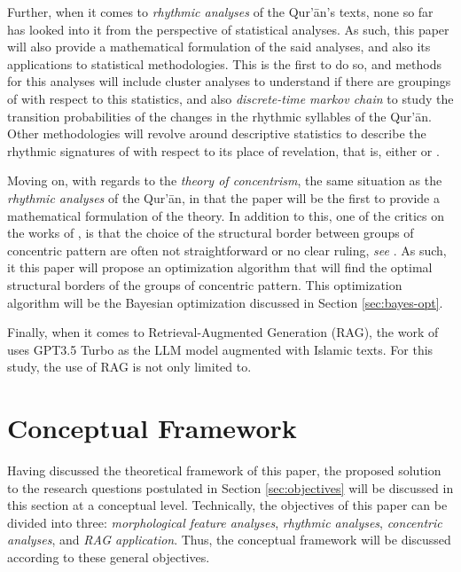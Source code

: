 Further, when it comes to \textit{rhythmic analyses} of the Qur'\=an's texts, none so far has looked into it from the perspective of statistical analyses. As such, this paper will also provide a mathematical formulation of the said analyses, and also its applications to statistical methodologies. This is the first to do so, and methods for this analyses will include cluster analyses to understand if there are groupings of   with respect to this statistics, and also \textit{discrete-time markov chain} to study the transition probabilities of the changes in the rhythmic syllables of the Qur'\=an.  Other methodologies will revolve around descriptive statistics to describe the rhythmic signatures of   with respect to its place of revelation, that is, either   or  .

Moving on, with regards to the \textit{theory of concentrism}, the same situation as the \textit{rhythmic analyses} of the Qur'\=an, in that the paper will be the first to provide a mathematical formulation of the theory. In addition to this, one of the critics on the works of , is that the choice of the structural border between groups of concentric pattern are often not straightforward or no clear ruling, \textit{see} . As such, it this paper will propose an optimization algorithm that will find the optimal structural borders of the groups of concentric pattern. This optimization algorithm will be the Bayesian optimization discussed in Section \ref{sec:bayes-opt}.

Finally, when it comes to Retrieval-Augmented Generation (RAG), the work of  uses GPT3.5 Turbo as the LLM model augmented with Islamic texts. For this study, the use of RAG is not only limited to.

\section{Conceptual Framework}
Having discussed the theoretical framework of this paper, the proposed solution to the research questions postulated in Section \ref{sec:objectives} will be discussed in this section at a conceptual level. Technically, the objectives of this paper can be divided into three: \textit{morphological feature analyses}, \textit{rhythmic analyses}, \textit{concentric analyses}, and \textit{RAG application}. Thus, the conceptual framework will be discussed according to these general objectives.
